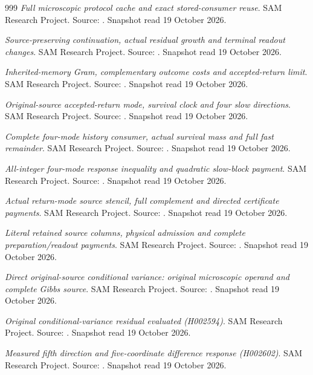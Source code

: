 \begin{thebibliography}{999}
 \emph{Full microscopic protocol cache and exact stored-consumer reuse}. SAM Research Project. Source: . Snapshot read 19 October 2026.

 \emph{Source-preserving continuation, actual residual growth and terminal readout changes}. SAM Research Project. Source: . Snapshot read 19 October 2026.

 \emph{Inherited-memory Gram, complementary outcome costs and accepted-return limit}. SAM Research Project. Source: . Snapshot read 19 October 2026.

 \emph{Original-source accepted-return mode, survival clock and four slow directions}. SAM Research Project. Source: . Snapshot read 19 October 2026.

 \emph{Complete four-mode history consumer, actual survival mass and full fast remainder}. SAM Research Project. Source: . Snapshot read 19 October 2026.

 \emph{All-integer four-mode response inequality and quadratic slow-block payment}. SAM Research Project. Source: . Snapshot read 19 October 2026.

 \emph{Actual return-mode source stencil, full complement and directed certificate payments}. SAM Research Project. Source: . Snapshot read 19 October 2026.

 \emph{Literal retained source columns, physical admission and complete preparation/readout payments}. SAM Research Project. Source: . Snapshot read 19 October 2026.

 \emph{Direct original-source conditional variance: original microscopic operand and complete Gibbs source}. SAM Research Project. Source: . Snapshot read 19 October 2026.

 \emph{Original conditional-variance residual evaluated (H002594)}. SAM Research Project. Source: . Snapshot read 19 October 2026.

 \emph{Measured fifth direction and five-coordinate difference response (H002602)}. SAM Research Project. Source: . Snapshot read 19 October 2026.


\end{thebibliography}
